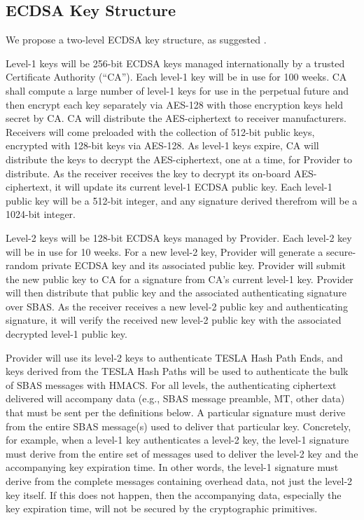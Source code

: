 \documentclass[letterpaper,times]{IONconf/IONconf}
\begin{document}
\subsection{ECDSA Key Structure} \label{sec: ECDSA Key Structure}

We propose a two-level ECDSA key structure, as suggested \cite{Neish_Dissertation}.

Level-1 keys will be 256-bit ECDSA keys managed internationally by a trusted Certificate Authority (``CA'').
Each level-1 key will be in use for 100 weeks.
CA shall compute a large number of level-1 keys for use in the perpetual future and then encrypt each key separately via AES-128 with those encryption keys held secret by CA.
CA will distribute the AES-ciphertext to receiver manufacturers.
Receivers will come preloaded with the collection of 512-bit public keys, encrypted with 128-bit keys via AES-128.
As level-1 keys expire, CA will distribute the keys to decrypt the AES-ciphertext, one at a time, for Provider to distribute.
As the receiver receives the key to decrypt its on-board AES-ciphertext, it will update its current level-1 ECDSA public key.
Each level-1 public key will be a 512-bit integer, and any signature derived therefrom will be a 1024-bit integer.

Level-2 keys will be 128-bit ECDSA keys managed by Provider.
Each level-2 key will be in use for 10 weeks.
For a new level-2 key, Provider will generate a secure-random private ECDSA key and its associated public key.
Provider will submit the new public key to CA for a signature from CA's current level-1 key.
Provider will then distribute that public key and the associated authenticating signature over SBAS.
As the receiver receives a new level-2 public key and authenticating signature, it will verify the received new level-2 public key with the associated decrypted level-1 public key.

Provider will use its level-2 keys to authenticate TESLA Hash Path Ends, and keys derived from the TESLA Hash Paths will be used to authenticate the bulk of SBAS messages with HMACS.
For all levels, the authenticating ciphertext delivered will accompany data (e.g., SBAS message preamble, MT, other data) that must be sent per the definitions below.
A particular signature must derive from the entire SBAS message(s) used to deliver that particular key.
Concretely, for example, when a level-1 key authenticates a level-2 key, the level-1 signature must derive from the entire set of messages used to deliver the level-2 key and the accompanying key expiration time. 
In other words, the level-1 signature must derive from the complete messages containing overhead data, not just the level-2 key itself.
If this does not happen, then the accompanying data, especially the key expiration time, will not be secured by the cryptographic primitives.
\end{document}
